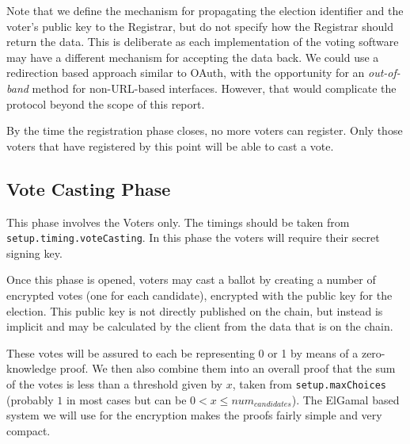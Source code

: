 Note that we define the mechanism for propagating the election identifier and the voter's public key to the Registrar, but do not specify how the Registrar should return the data. This is deliberate as each implementation of the voting software may have a different mechanism for accepting the data back. We could use a redirection based approach similar to OAuth, with the opportunity for an \emph{out-of-band} method for non-URL-based interfaces. However, that would complicate the protocol beyond the scope of this report.

By the time the registration phase closes, no more voters can register. Only those voters that have registered by this point will be able to cast a vote.

\subsection{Vote Casting Phase}
\label{ch:astris:detail:vote}

This phase involves the Voters only. The timings should be taken from \texttt{setup.timing.voteCasting}. In this phase the voters will require their secret signing key.

Once this phase is opened, voters may cast a ballot by creating a number of encrypted votes (one for each candidate), encrypted with the public key for the election. This public key is not directly published on the chain, but instead is implicit and may be calculated by the client from the data that is on the chain.

These votes will be assured to each be representing 0 or 1 by means of a zero-knowledge proof. We then also combine them into an overall proof that the sum of the votes is less than a threshold given by $x$, taken from \texttt{setup.maxChoices} (probably $1$ in most cases but can be $0 < x \le num_{candidates}$). The ElGamal based system we will use for the encryption makes the proofs fairly simple and very compact.

